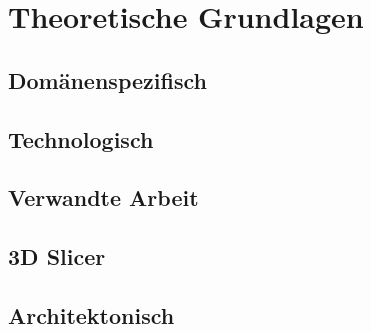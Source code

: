 \chapter{Theoretische Grundlagen}
\label{chap:theoretische_grundlagen}

\section{Domänenspezifisch}

\section{Technologisch}

\section{Verwandte Arbeit}

\section{3D Slicer}

\section{Architektonisch}